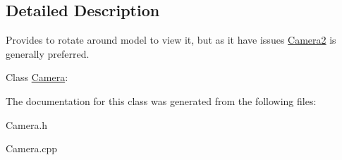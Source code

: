 \subsection{Detailed Description}
Provides to rotate around model to view it, but as it have issues \hyperlink{class_camera2}{Camera2} is generally preferred. 

Class \hyperlink{class_camera}{Camera}\+: 

The documentation for this class was generated from the following files\+:\begin{DoxyCompactItemize}
\item 
Camera.\+h\item 
Camera.\+cpp\end{DoxyCompactItemize}

